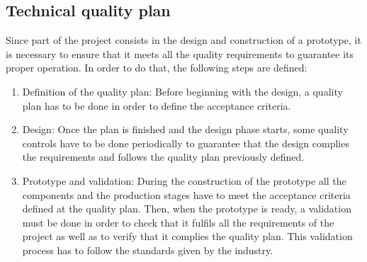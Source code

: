 \subsection{Technical quality plan}
Since part of the project consists in the design and construction of a prototype, it is necessary to ensure that it meets all the quality requirements to guarantee its proper operation. In order to do that, the following steps are defined:
\begin{enumerate}
	\item Definition of the quality plan: Before beginning with the design, a quality plan has to be done in order to define the acceptance criteria.
	\item Design: Once the plan is finished and the design phase starts, some quality controls have to be done periodically to guarantee that the design complies the requirements and follows the quality plan previously defined.
	\item Prototype and validation: During the construction of the prototype all the components and the production stages have to meet the acceptance criteria defined at the quality plan. Then, when the prototype is ready, a validation must be done in order to check that it fulfils all the requirements of the project as well as to verify that it complies the quality plan. This validation process has to follow the standards given by the industry.
\end{enumerate}

